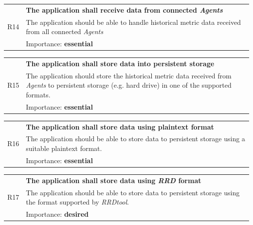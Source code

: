 \documentclass[12pt,a4paper,table]{article}
\begin{document}
                \vspace{0.5cm}
                \noindent
                \begin{tabular}{ p{0.7cm}|p{14.5cm} }
                    \multirow{3}{*}{R14} & \textbf{The application shall receive data from connected \textit{Agents}}\\
                    \cline{2-2}
                    & The application should be able to handle historical metric data received from all connected \textit{Agents}\\
                    \cline{2-2}
                    & Importance: \textbf{essential}
                \end{tabular}

                \vspace{0.5cm}
                \noindent
                \begin{tabular}{ p{0.7cm}|p{14.5cm} }
                    \multirow{3}{*}{R15} & \textbf{The application shall store data into persistent storage}\\
                    \cline{2-2}
                    & The application should store the historical metric data received from \textit{Agents} to persistent storage (e.g. hard drive) in one of the supported formats.\\
                    \cline{2-2}
                    & Importance: \textbf{essential}
                \end{tabular}

                \vspace{0.5cm}
                \noindent
                \begin{tabular}{ p{0.7cm}|p{14.5cm} }
                    \multirow{3}{*}{R16} & \textbf{The application shall store data using plaintext format}\\
                    \cline{2-2}
                    & The application should be able to store data to persistent storage using a suitable plaintext format.\\
                    \cline{2-2}
                    & Importance: \textbf{essential}
                \end{tabular}

                \vspace{0.5cm}
                \noindent
                \begin{tabular}{ p{0.7cm}|p{14.5cm} }
                    \multirow{3}{*}{R17} & \textbf{The application shall store data using \textit{RRD} format}\\
                    \cline{2-2}
                    & The application should be able to store data to persistent storage using the format supported by \textit{RRDtool}.\\
                    \cline{2-2}
                    & Importance: \textbf{desired}
                \end{tabular}
\end{document}
